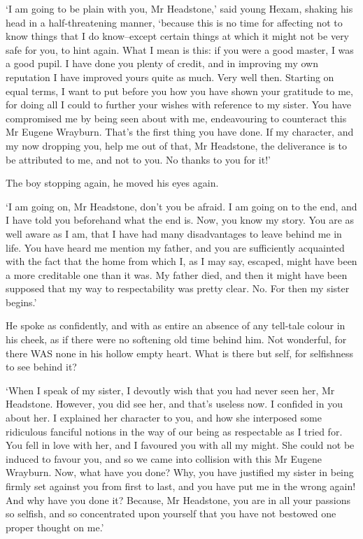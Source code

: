 ‘I am going to be plain with you, Mr Headstone,’ said young Hexam,
shaking his head in a half-threatening manner, ‘because this is no time
for affecting not to know things that I do know--except certain things
at which it might not be very safe for you, to hint again. What I mean
is this: if you were a good master, I was a good pupil. I have done you
plenty of credit, and in improving my own reputation I have improved
yours quite as much. Very well then. Starting on equal terms, I want to
put before you how you have shown your gratitude to me, for doing all
I could to further your wishes with reference to my sister. You have
compromised me by being seen about with me, endeavouring to counteract
this Mr Eugene Wrayburn. That’s the first thing you have done. If my
character, and my now dropping you, help me out of that, Mr Headstone,
the deliverance is to be attributed to me, and not to you. No thanks to
you for it!’

The boy stopping again, he moved his eyes again.

‘I am going on, Mr Headstone, don’t you be afraid. I am going on to the
end, and I have told you beforehand what the end is. Now, you know my
story. You are as well aware as I am, that I have had many disadvantages
to leave behind me in life. You have heard me mention my father, and you
are sufficiently acquainted with the fact that the home from which I, as
I may say, escaped, might have been a more creditable one than it was.
My father died, and then it might have been supposed that my way to
respectability was pretty clear. No. For then my sister begins.’

He spoke as confidently, and with as entire an absence of any tell-tale
colour in his cheek, as if there were no softening old time behind him.
Not wonderful, for there WAS none in his hollow empty heart. What is
there but self, for selfishness to see behind it?

‘When I speak of my sister, I devoutly wish that you had never seen
her, Mr Headstone. However, you did see her, and that’s useless now. I
confided in you about her. I explained her character to you, and how she
interposed some ridiculous fanciful notions in the way of our being as
respectable as I tried for. You fell in love with her, and I favoured
you with all my might. She could not be induced to favour you, and so
we came into collision with this Mr Eugene Wrayburn. Now, what have you
done? Why, you have justified my sister in being firmly set against you
from first to last, and you have put me in the wrong again! And why
have you done it? Because, Mr Headstone, you are in all your passions
so selfish, and so concentrated upon yourself that you have not bestowed
one proper thought on me.’

